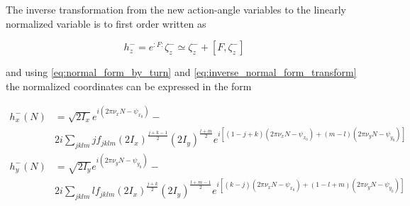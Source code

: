 The inverse transformation from the new action-angle variables to the linearly normalized variable is to first order written as

\begin{equation}
    h_{z}^{-} = e^{: F:} \zeta_{z}^{-} \simeq \zeta_{z}^{-} + \left[F, \zeta_{z}^{-}\right]
    \label{eq:inverse_normal_form_transform}
\end{equation}

and using \cref{eq:normal_form_by_turn} and \cref{eq:inverse_normal_form_transform} the normalized coordinates can be expressed in the form

\begin{equation}
    \begin{aligned}
    h_{x}^{-}(N) &= \sqrt{2 I_{x}} e^{i\left(2 \pi \nu_{x} N - \psi_{x_{0}}\right)} - \\
    & 2 i \sum_{jklm} j f_{jklm} \left(2 I_{x}\right)^{\frac{j+k-1}{2}} \left(2 I_{y}\right)^{\frac{l+m}{2}} e^{i \left[(1-j+k) \left(2 \pi \nu_{x} N-\psi_{x_{0}}\right) + (m-l) \left(2 \pi \nu_{y} N-\psi_{y_{0}}\right) \right]} \\
    h_{y}^{-}(N) &= \sqrt{2 I_{y}} e^{i\left(2 \pi \nu_{y} N - \psi_{y_{0}}\right)} - \\
    & 2 i \sum_{jklm} l f_{jklm} \left(2 I_{x}\right)^{\frac{j+k}{2}} \left(2 I_{y}\right)^{\frac{l+m-1}{2}} e^{i \left[(k-j) \left(2 \pi \nu_{x} N-\psi_{x_{0}}\right) + (1-l+m) \left(2 \pi \nu_{y} N-\psi_{y_{0}}\right) \right]}
    \end{aligned}
    \label{eq:normal_form_coordinates}
\end{equation}

